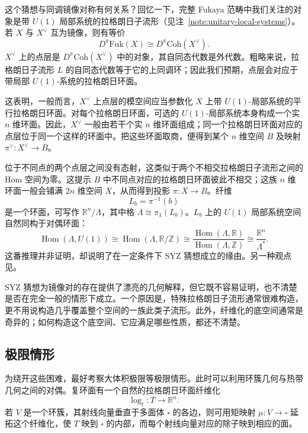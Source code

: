 这个猜想与同调镜像对称有何关系？回忆一下，完整 Fukaya 范畴中我们关注的对象是带 $U(1)$ 局部系统的拉格朗日子流形（见注~\ref{note:unitary-local-systems}）。若 $X$ 与 $X^\vee$ 互为镜像，则有等价
\[
  D^\pi\mathrm{Fuk}(X)\cong D^\pi\mathrm{Coh}(X^\vee).
\]
$X^\vee$ 上的点层是 $D^\pi\mathrm{Coh}(X^\vee)$ 中的对象，其自同态代数是外代数。粗略来说，拉格朗日子流形 $L$ 的自同态代数等于它的上同调环；因此我们预期，点层会对应于带局部 $U(1)$-系统的拉格朗日环面。

这表明，一般而言，$X^\vee$ 上点层的模空间应当参数化 $X$ 上带 $U(1)$-局部系统的平行拉格朗日环面。对每个拉格朗日环面，可选的 $U(1)$-局部系统本身构成一个实 $n$ 维环面。因此，$X^\vee$ 一般由若干个实 $n$ 维环面组成；同一个拉格朗日环面对应的点层位于同一个这样的环面中。把这些环面取商，便得到某个 $n$ 维空间 $B$ 及映射 $\pi^\vee\colon X^\vee\to B$。

位于不同点的两个点层之间没有态射，这类似于两个不相交拉格朗日子流形之间的 Hom 空间为零。这提示 $B$ 中不同点对应的拉格朗日环面彼此不相交；这族 $n$ 维环面一般会铺满 $2n$ 维空间 $X$，从而得到投影 $\pi\colon X\to B$。纤维
\[
  L_b=\pi^{-1}(b)
\]
是一个环面，可写作 $\mathbb R^n/\Lambda$，其中格 $\Lambda\cong\pi_1(L_b)$。$L_b$ 上的 $U(1)$ 局部系统空间自然同构于对偶环面：
\[
  \operatorname{Hom}(\Lambda,U(1))
  \cong\operatorname{Hom}(\Lambda,\mathbb R/\mathbb Z)
  \cong\frac{\operatorname{Hom}(\Lambda,\mathbb R)}
  {\operatorname{Hom}(\Lambda,\mathbb Z)}
  \cong\frac{\mathbb R^n}{\Lambda^*}.
\]
这番推理并非证明，却说明了在一定条件下 SYZ 猜想成立的缘由。另一种观点见。

SYZ 猜想为镜像对的存在提供了漂亮的几何解释，但它既不容易证明，也不清楚是否在完全一般的情形下成立。一个原因是，特殊拉格朗日子流形通常很难构造，更不用说构造几乎覆盖整个空间的一族此类子流形。此外，纤维化的底空间通常是奇异的；如何构造这个底空间、它应满足哪些性质，都还不清楚。

\subsection*{极限情形}
为绕开这些困难，最好考察大体积极限等极限情形。此时可以利用环簇几何与热带几何之间的对偶。复环面有一个自然的拉格朗日环面纤维化
\[
  \log_t\colon T\to\mathbb R^n.
\]
若 $V$ 是一个环簇，其射线向量垂直于多面体 $\square$ 的各边，则可用矩映射 $\mu\colon V\to\square$ 延拓这个纤维化，使 $T$ 映到 $\square$ 的内部，而每个射线向量对应的除子映到相应的面。

